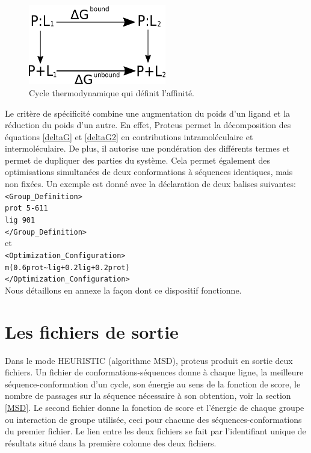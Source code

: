    \begin{figure}[!htbp]
     \centering
       \includegraphics[width=6cm]{figure/cycleThermoLigand.pdf} 
     \caption{Cycle thermodynamique qui définit l'affinité.}
\label{fig:cycleThermoLigand}
   \end{figure}
Le critère de spécificité combine une augmentation du poids d'un ligand et la réduction du poids d'un autre. En effet, Proteus permet la décomposition des équations \ref{deltaG} et \ref{deltaG2} en contributions intramoléculaire et intermoléculaire. De plus, il autorise une pondération des différents termes et permet de dupliquer des parties du système. Cela permet également des optimisations simultanées de deux conformations à séquences identiques, mais non fixées. Un exemple est donné avec la déclaration de deux balises suivantes:\\
\verb!<Group_Definition>!\\
\verb!prot 5-611!\\
\verb!lig 901!\\
\verb!</Group_Definition>!\\
et\\
\verb!<Optimization_Configuration>!\\
\verb!m(0.6prot~lig+0.2lig+0.2prot)!\\
\verb!</Optimization_Configuration>!\\
Nous détaillons en annexe la façon dont ce dispositif fonctionne.

\section{Les fichiers de sortie}
\label{proteusIO}
Dans le mode HEURISTIC (algorithme MSD), proteus produit en sortie deux fichiers. Un fichier de conformations-séquences donne à chaque ligne, la meilleure séquence-conformation d'un cycle, son énergie au sens de la fonction de score, le nombre de passages sur la séquence nécessaire à son obtention, voir la section \vref{MSD}. Le second fichier donne la fonction de score et l'énergie de chaque groupe ou interaction de groupe utilisée, ceci pour chacune des séquences-conformations du premier fichier. Le lien entre les deux fichiers se fait par l'identifiant unique de résultats situé dans la première colonne des deux fichiers.

